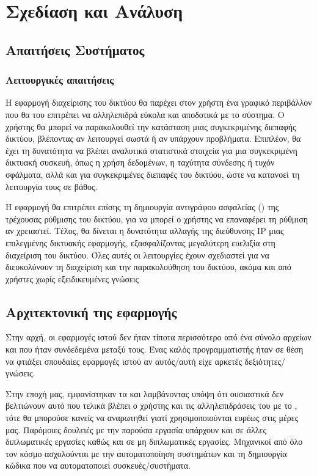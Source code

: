 \chapter{Σχεδίαση και Ανάλυση}

\section{Απαιτήσεις Συστήματος}




\subsection{Λειτουργικές απαιτήσεις}

Η εφαρμογή διαχείρισης του δικτύου θα παρέχει στον χρήστη ένα γραφικό 
περιβάλλον που θα του επιτρέπει να αλληλεπιδρά εύκολα και αποδοτικά 
με το σύστημα. Ο χρήστης θα μπορεί να παρακολουθεί την κατάσταση μιας 
συγκεκριμένης διεπαφής δικτύου, βλέποντας αν λειτουργεί σωστά ή αν 
υπάρχουν προβλήματα. Επιπλέον, θα έχει τη δυνατότητα να βλέπει 
αναλυτικά στατιστικά στοιχεία για μια συγκεκριμένη δικτυακή συσκευή, 
όπως η χρήση δεδομένων, η ταχύτητα σύνδεσης ή τυχόν σφάλματα, αλλά 
και για συγκεκριμένες διεπαφές του δικτύου, ώστε να κατανοεί τη λειτουργία τους σε βάθος.

Η εφαρμογή θα επιτρέπει επίσης τη δημιουργία αντιγράφου ασφαλείας () 
της τρέχουσας ρύθμισης του δικτύου, για να μπορεί ο χρήστης να 
επαναφέρει τη ρύθμιση αν χρειαστεί. Τέλος, θα δίνεται η 
δυνατότητα αλλαγής της διεύθυνσης IP μιας επιλεγμένης δικτυακής 
εφαρμογής, εξασφαλίζοντας μεγαλύτερη ευελιξία στη διαχείριση του 
δικτύου. Όλες αυτές οι λειτουργίες έχουν σχεδιαστεί για να 
διευκολύνουν τη διαχείριση και την παρακολούθηση του δικτύου, 
ακόμα και από χρήστες χωρίς εξειδικευμένες γνώσεις



\section{Αρχιτεκτονική της εφαρμογής}

Στην αρχή, οι εφαρμογές ιστού δεν ήταν τίποτα περισσότερο από ένα σύνολο αρχείων  και
 που ήταν συνδεδεμένα μεταξύ τους. Ένας καλός προγραμματιστής ήταν σε θέση να φτιάξει σπουδαίες εφαρμογές ιστού αν αυτός/αυτή
είχε αρκετές δεξιότητες/γνώσεις.

Στην εποχή μας, εμφανίστηκαν τα  και λαμβάνοντας υπόψη ότι ουσιαστικά δεν βελτιώνουν αυτό που τελικά βλέπει ο χρήστης και τις
αλληλεπιδράσεις του με το , τότε
θα μπορούσε κανείς να αναρωτηθεί γιατί χρησιμοποιούνται ευρέως στις μέρες μας.
Παρόμοιες δουλειές με την παρούσα εργασία υπάρχουν και σε άλλες διπλωματικές εργασίες καθώς και σε μη διπλωματικές εργασίες. Μηχανικοί από όλο τον κόσμο
ασχολούνται με την αυτοματοποίηση συστημάτων και τη δημιουργία κώδικα που να αυτοματοποιεί συσκευές/συστήματα. 

